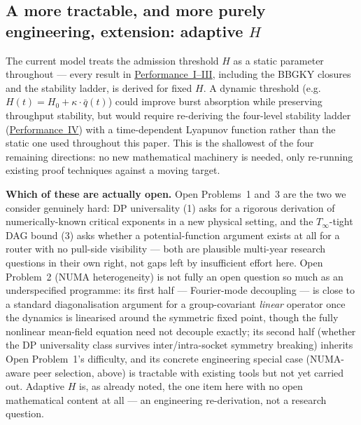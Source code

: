 \documentclass[11pt,a4paper]{report}
\begin{document}
\subsection{A more tractable, and more purely engineering, extension: adaptive $H$}

The current model treats the admission threshold $H$ as a static
parameter throughout --- every result in
\hyperref[chap:load_balance]{Performance~I--III}, including the
BBGKY closures and the stability ladder, is derived for fixed $H$. A
dynamic threshold (e.g.\ $H(t) = H_0 + \kappa \cdot \bar{q}(t)$) could
improve burst absorption while preserving throughput stability, but
would require re-deriving the four-level stability ladder
(\hyperref[chap:stability]{Performance~IV}) with a time-dependent
Lyapunov function rather than the static one used throughout this
paper. This is the shallowest of the four remaining directions: no
new mathematical machinery is needed, only re-running existing proof
techniques against a moving target.

\medskip
\noindent\textbf{Which of these are actually open.}
Open Problems~1 and~3 are the two we consider genuinely hard: DP
universality (1) asks for a rigorous derivation of numerically-known
critical exponents in a new physical setting, and the
$T_\infty$-tight DAG bound (3) asks whether a potential-function
argument exists at all for a router with no pull-side visibility ---
both are plausible multi-year research questions in their own right,
not gaps left by insufficient effort here. Open Problem~2 (NUMA
heterogeneity) is not fully an open question so much as an
underspecified programme: its first half --- Fourier-mode decoupling
--- is close to a standard diagonalisation argument for a
group-covariant \emph{linear} operator once the dynamics is linearised
around the symmetric fixed point, though the fully nonlinear
mean-field equation need not decouple exactly; its second half
(whether the DP universality class survives inter/intra-socket
symmetry breaking) inherits Open Problem~1's difficulty, and its
concrete engineering special case (NUMA-aware peer selection, above)
is tractable with existing tools but not yet carried out. Adaptive $H$
is, as already noted, the one item here with no open mathematical
content at all --- an engineering re-derivation, not a research
question.
\end{document}
